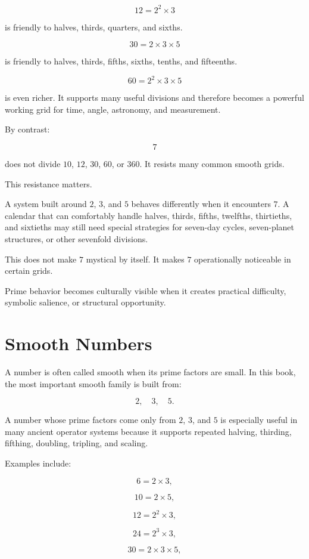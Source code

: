 \documentclass[11pt]{book}
\begin{document}
\[
12 = 2^2 \times 3
\]

is friendly to halves, thirds, quarters, and sixths.

\[
30 = 2 \times 3 \times 5
\]

is friendly to halves, thirds, fifths, sixths, tenths, and fifteenths.

\[
60 = 2^2 \times 3 \times 5
\]

is even richer. It supports many useful divisions and therefore becomes a powerful working grid for time, angle, astronomy, and measurement.

By contrast:

\[
7
\]

does not divide \(10\), \(12\), \(30\), \(60\), or \(360\). It resists many common smooth grids.

This resistance matters.

A system built around \(2\), \(3\), and \(5\) behaves differently when it encounters \(7\). A calendar that can comfortably handle halves, thirds, fifths, twelfths, thirtieths, and sixtieths may still need special strategies for seven-day cycles, seven-planet structures, or other sevenfold divisions.

This does not make \(7\) mystical by itself. It makes \(7\) operationally noticeable in certain grids.

Prime behavior becomes culturally visible when it creates practical difficulty, symbolic salience, or structural opportunity.

\section{Smooth Numbers}

A number is often called smooth when its prime factors are small. In this book, the most important smooth family is built from:

\[
2,\quad 3,\quad 5.
\]

A number whose prime factors come only from \(2\), \(3\), and \(5\) is especially useful in many ancient operator systems because it supports repeated halving, thirding, fifthing, doubling, tripling, and scaling.

Examples include:

\[
6 = 2 \times 3,
\]

\[
10 = 2 \times 5,
\]

\[
12 = 2^2 \times 3,
\]

\[
24 = 2^3 \times 3,
\]

\[
30 = 2 \times 3 \times 5,
\]
\end{document}
